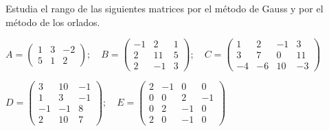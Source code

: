 \begin{ejre} Estudia el rango de las siguientes matrices por el método de Gauss y por el método de los orlados.

$A=\left( \begin{matrix} 1&3&-2\\5&1&2  \end{matrix} \right); \quad
B=\left( \begin{matrix} -1&2&1\\2&11&5\\2&-1&3  \end{matrix} \right); \quad
C=\left( \begin{matrix}  1&2&-1&3\\3&7&0&11\\-4&-6&10&-3 \end{matrix} \right)$

$D=\left( \begin{matrix} 3&10&-1 \\ 1&3&-1 \\ -1&-1&8\\2&10&7  \end{matrix} \right); \quad 
E=\left( \begin{matrix} 2&-1&0&0\\0&0&2&-1\\0&2&-1&0\\2&0&-1&0  \end{matrix} \right)$
\end{ejre}
